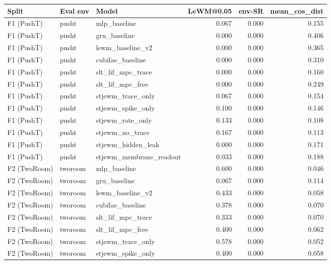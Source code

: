 \documentclass{article}
\begin{document}
\begin{table}[ht]
\centering
\scriptsize
\begin{tabular}{lllrrr}
\toprule
Split & Eval env & Model & LeWM@0.05 & env-SR & mean\_cos\_dist \\
\midrule
F1 (PushT) & pusht & mlp\_baseline                & 0.067 & 0.000 & 0.155 \\
F1 (PushT) & pusht & gru\_baseline                & 0.000 & 0.000 & 0.406 \\
F1 (PushT) & pusht & lewm\_baseline\_v2           & 0.000 & 0.000 & 0.365 \\
F1 (PushT) & pusht & cubifae\_baseline            & 0.000 & 0.000 & 0.310 \\
F1 (PushT) & pusht & slt\_lif\_mpc\_trace         & 0.000 & 0.000 & 0.160 \\
F1 (PushT) & pusht & slt\_lif\_mpc\_free          & 0.000 & 0.000 & 0.249 \\
F1 (PushT) & pusht & stjewm\_trace\_only          & 0.067 & 0.000 & 0.154 \\
F1 (PushT) & pusht & stjewm\_spike\_only          & 0.100 & 0.000 & 0.146 \\
F1 (PushT) & pusht & stjewm\_rate\_only           & 0.133 & 0.000 & 0.108 \\
F1 (PushT) & pusht & stjewm\_no\_trace            & 0.167 & 0.000 & 0.113 \\
F1 (PushT) & pusht & stjewm\_hidden\_leak         & 0.000 & 0.000 & 0.171 \\
F1 (PushT) & pusht & stjewm\_membrane\_readout    & 0.033 & 0.000 & 0.188 \\
\midrule
F2 (TwoRoom) & tworoom & mlp\_baseline              & 0.600 & 0.000 & 0.046 \\
F2 (TwoRoom) & tworoom & gru\_baseline              & 0.067 & 0.000 & 0.114 \\
F2 (TwoRoom) & tworoom & lewm\_baseline\_v2         & 0.433 & 0.000 & 0.058 \\
F2 (TwoRoom) & tworoom & cubifae\_baseline          & 0.378 & 0.000 & 0.070 \\
F2 (TwoRoom) & tworoom & slt\_lif\_mpc\_trace       & 0.333 & 0.000 & 0.070 \\
F2 (TwoRoom) & tworoom & slt\_lif\_mpc\_free        & 0.400 & 0.000 & 0.062 \\
F2 (TwoRoom) & tworoom & stjewm\_trace\_only        & 0.578 & 0.000 & 0.052 \\
F2 (TwoRoom) & tworoom & stjewm\_spike\_only        & 0.400 & 0.000 & 0.058 \\

\end{tabular}
\end{table}
\end{document}
